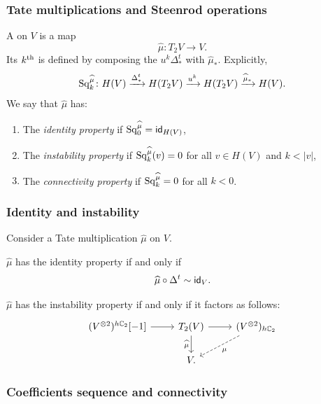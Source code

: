 \subsubsection{Tate multiplications and Steenrod operations}
A  on \(V\) is a map
\[
\widehat\mu \colon T_2 V \to V.
\]
Its \(k^{\mathrm{th}}\)  is defined by composing the  \(u^k \Delta^t_*\) with \(\widehat\mu_*\).
Explicitly,
\[
\operatorname{Sq}_k^{\widehat\mu} \colon H(V) \xrightarrow{\Delta^t_*} H(T_2 V) \xrightarrow{u^k} H(T_2 V) \xrightarrow{\widehat\mu_*} H(V).
\]
We say that \(\widehat\mu\) has:
\begin{enumerate}
	\item The \textit{identity property} if \(\operatorname{Sq}_0^{\widehat\mu} = \mathsf{id}_{H(V)}\),
	\item The \textit{instability property} if \(\operatorname{Sq}_k^{\widehat\mu}(v) = 0\) for all \(v \in H(V)\) and \(k < |v|\),
	\item The \textit{connectivity property} if \(\operatorname{Sq}_k^{\widehat\mu} = 0\) for all \(k < 0\).
\end{enumerate}


\subsubsection{Identity and instability}

Consider a Tate multiplication \(\widehat\mu\) on \(V\).

\begin{lemma}
	\(\widehat\mu\) has the identity property if and only if
	\[
	\widehat\mu \circ \Delta^t \sim \mathsf{id}_V.
	\]
\end{lemma}

\begin{lemma}\label{linstability}
	\(\widehat\mu\) has the instability property if and only if it factors as follows:
	\[
	\begin{tikzcd}[column sep=24pt]
		(V^{\ot 2})^{h\cyc_2}[-1] \rar & T_2(V) \arrow[r] \arrow[d, "\widehat\mu"'] &
		(V^{\ot 2})_{h\cyc_2} \arrow[dl, dashed, "\mu"] \\
		& V. &
	\end{tikzcd}
	\]
\end{lemma}

\subsubsection{Coefficients sequence and connectivity}

